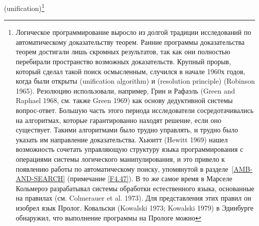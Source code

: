(unification)\footnote{Логическое программирование выросло из 
долгой традиции исследований по 
автоматическому доказательству теорем.  Ранние
программы доказательства теорем достигали лишь скромных результатов,
так как они полностью перебирали пространство возможных
доказательств.  Крупный прорыв, который сделал такой поиск
осмысленным, случился в начале 1960х годов, когда были открыты  (unification algorithm) и  (resolution 
principle) (Robinson 1965).
Резолюцию использовали, например, Грин и Рафаэль (Green and Raphael 
1968,
см. также Green 1969) как основу дедуктивной
системы вопрос-ответ.  Большую часть этого периода исследователи
сосредотачивались на алгоритмах, которые гарантированно находят решение,
если оно существует.  Такими алгоритмами было трудно управлять, и
трудно было указать им направление доказательства. Хьюитт 
(Hewitt 1969) нашел возможность сочетать 
управляющую структуру языка программирования с операциями системы
логического манипулирования, и это привело к появлению работы по автоматическому
поиску, упомянутой в разделе~\ref{AMB-AND-SEARCH}
(примечание \ref{F4.47}). В то же самое время  в
Марселе Кольмероэ разрабатывал системы обработки
естественного языка, основанные на правилах (см. Colmerauer et
al. 1973).
Для представления этих правил он изобрел язык Пролог. Ковальски 
(Kowalski 1973; Kowalski 1979)
в Эдинбурге обнаружил, что выполнение программы на Прологе можно
}
